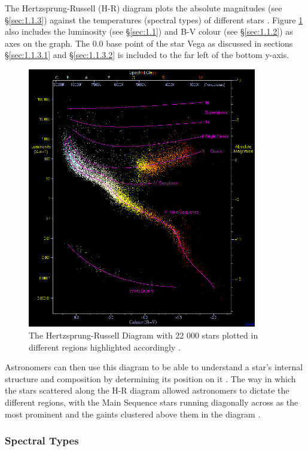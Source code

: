\documentclass[12pt]{article}
\begin{document}
The Hertzsprung-Russell (H-R) diagram plots the absolute magnitudes (see §\ref{sec:1.1.3}) against the temperatures (spectral types) of different stars \cite{brithr}.
Figure \ref{fig:hrdiagram} also includes the luminosity (see §\ref{sec:1.1}) and B-V colour (see §\ref{sec:1.1.2}) as axes on the graph.
The 0.0 base point of the star Vega as discussed in sections §\ref{sec:1.1.3.1} and §\ref{sec:1.1.3.2} is included to the far left of the bottom y-axis.

\begin{figure}[H]
    \centering
    \includegraphics[width=10cm]{HRDiagram.png}
    \caption{\centering The Hertzsprung-Russell Diagram with 22 000 stars plotted in different regions highlighted accordingly \protect\cite{wikihr}.}
    \label{fig:hrdiagram}
\end{figure}

Astronomers can then use this diagram to be able to understand a star's internal structure and composition by determining its position on it \cite{cosmoshr,brithr}.
The way in which the stars scattered along the H-R diagram allowed astronomers to dictate the different regions, with the Main Sequence stars running diagonally across as
the most prominent and the gaints clustered above them in the diagram \cite{lcohr,cosmoshr}.

\subsubsection{Spectral Types} \label{sec:1.2.1}
\end{document}
